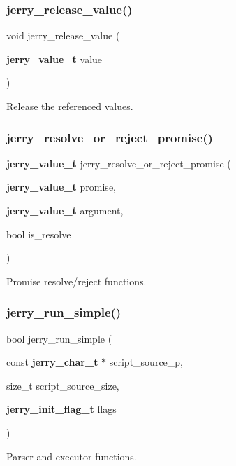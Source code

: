 \subsubsection{jerry\_release\_value()}
{\footnotesize\ttfamily void jerry\+\_\+release\+\_\+value (\begin{DoxyParamCaption}\item[{\textbf{ jerry\+\_\+value\+\_\+t}}]{value }\end{DoxyParamCaption})}

Release the referenced values. \mbox{\label{group___core_ga97f597efd20e7d1d86205aff53106e56}} 
\subsubsection{jerry\_resolve\_or\_reject\_promise()}
{\footnotesize\ttfamily \textbf{ jerry\+\_\+value\+\_\+t} jerry\+\_\+resolve\+\_\+or\+\_\+reject\+\_\+promise (\begin{DoxyParamCaption}\item[{\textbf{ jerry\+\_\+value\+\_\+t}}]{promise,  }\item[{\textbf{ jerry\+\_\+value\+\_\+t}}]{argument,  }\item[{bool}]{is\+\_\+resolve }\end{DoxyParamCaption})}

Promise resolve/reject functions. \mbox{\label{group___core_ga0bccd230d9f509bad9460a24b5936195}} 
\subsubsection{jerry\_run\_simple()}
{\footnotesize\ttfamily bool jerry\+\_\+run\+\_\+simple (\begin{DoxyParamCaption}\item[{const \textbf{ jerry\+\_\+char\+\_\+t} $\ast$}]{script\+\_\+source\+\_\+p,  }\item[{size\+\_\+t}]{script\+\_\+source\+\_\+size,  }\item[{\textbf{ jerry\+\_\+init\+\_\+flag\+\_\+t}}]{flags }\end{DoxyParamCaption})}

Parser and executor functions. \mbox{\label{group___core_ga96ae332ce225f6631eb6310e51890ffa}} 
